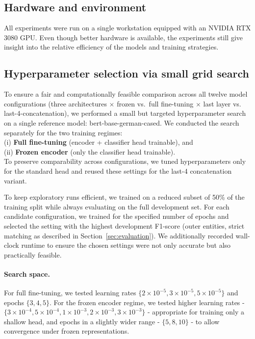 \documentclass[11pt,a4paper,twocolumn]{article}
\begin{document}
\subsection{Hardware and environment}
All experiments were run on a single workstation equipped with an NVIDIA RTX 3080 GPU. Even though better hardware is available, the experiments still give insight into the relative efficiency of the models and training strategies.

\subsection{Hyperparameter selection via small grid search}
To ensure a fair and computationally feasible comparison across all twelve model configurations (three architectures $\times$ frozen vs.\ full fine-tuning $\times$ last layer vs. last-4-concatenation), we performed a small but targeted hyperparameter search on a single reference model: bert-base-german-cased. We conducted the search separately for the two training regimes:\\
(i) \textbf{Full fine-tuning} (encoder + classifier head trainable), and\\
(ii) \textbf{Frozen encoder} (only the classifier head trainable).\\
To preserve comparability across configurations, we tuned hyperparameters only for the standard head and reused these settings for the last-4 concatenation variant.

To keep exploratory runs efficient, we trained on a reduced subset of 50\% of the training split while always evaluating on the full development set. For each candidate configuration, we trained for the specified number of epochs and selected the setting with the highest development F1-score (outer entities, strict matching as described in Section~\ref{sec:evaluation}). We additionally recorded wall-clock runtime to ensure the chosen settings were not only accurate but also practically feasible.

\paragraph{Search space.}
For full fine-tuning, we tested learning rates $\{2\times 10^{-5}, 3\times 10^{-5}, 5\times 10^{-5}\}$ and epochs $\{3,4,5\}$.
For the frozen encoder regime, we tested higher learning rates - $\{3\times 10^{-4}, 5\times 10^{-4}, 1\times 10^{-3}, 2\times 10^{-3}, 3\times 10^{-3}\}$ - appropriate for training only a shallow head, and epochs in a slightly wider range - $\{5,8,10\}$ - to allow convergence under frozen representations.
\end{document}
